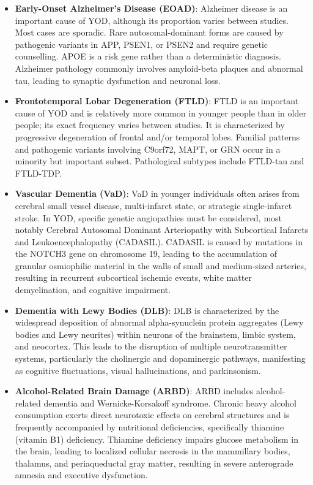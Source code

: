 \begin{itemize}
    \item \textbf{Early-Onset Alzheimer's Disease (EOAD)}: Alzheimer disease is an important cause of YOD, although its proportion varies between studies. Most cases are sporadic. Rare autosomal-dominant forms are caused by pathogenic variants in APP, PSEN1, or PSEN2 and require genetic counselling. APOE is a risk gene rather than a deterministic diagnosis. Alzheimer pathology commonly involves amyloid-beta plaques and abnormal tau, leading to synaptic dysfunction and neuronal loss.
    \item \textbf{Frontotemporal Lobar Degeneration (FTLD)}: FTLD is an important cause of YOD and is relatively more common in younger people than in older people; its exact frequency varies between studies. It is characterized by progressive degeneration of frontal and/or temporal lobes. Familial patterns and pathogenic variants involving C9orf72, MAPT, or GRN occur in a minority but important subset. Pathological subtypes include FTLD-tau and FTLD-TDP.
    \item \textbf{Vascular Dementia (VaD)}: VaD in younger individuals often arises from cerebral small vessel disease, multi-infarct state, or strategic single-infarct stroke. In YOD, specific genetic angiopathies must be considered, most notably Cerebral Autosomal Dominant Arteriopathy with Subcortical Infarcts and Leukoencephalopathy (CADASIL). CADASIL is caused by mutations in the NOTCH3 gene on chromosome 19, leading to the accumulation of granular osmiophilic material in the walls of small and medium-sized arteries, resulting in recurrent subcortical ischemic events, white matter demyelination, and cognitive impairment.
    \item \textbf{Dementia with Lewy Bodies (DLB)}: DLB is characterized by the widespread deposition of abnormal alpha-synuclein protein aggregates (Lewy bodies and Lewy neurites) within neurons of the brainstem, limbic system, and neocortex. This leads to the disruption of multiple neurotransmitter systems, particularly the cholinergic and dopaminergic pathways, manifesting as cognitive fluctuations, visual hallucinations, and parkinsonism.
    \item \textbf{Alcohol-Related Brain Damage (ARBD)}: ARBD includes alcohol-related dementia and Wernicke-Korsakoff syndrome. Chronic heavy alcohol consumption exerts direct neurotoxic effects on cerebral structures and is frequently accompanied by nutritional deficiencies, specifically thiamine (vitamin B1) deficiency. Thiamine deficiency impairs glucose metabolism in the brain, leading to localized cellular necrosis in the mammillary bodies, thalamus, and periaqueductal gray matter, resulting in severe anterograde amnesia and executive dysfunction.

\end{itemize}
